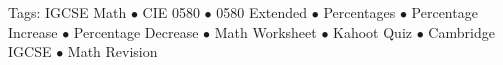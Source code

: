 \documentclass[11pt,a4paper]{article}
\begin{document}
\vspace{14pt}
\begin{center}
  \sffamily\scriptsize\textcolor{textmuted}{
    Tags: IGCSE Math $\bullet$ CIE 0580 $\bullet$ 0580 Extended $\bullet$ Percentages $\bullet$ Percentage Increase $\bullet$ Percentage Decrease $\bullet$ Math Worksheet $\bullet$ Kahoot Quiz $\bullet$ Cambridge IGCSE $\bullet$ Math Revision
  }
\end{center}
\end{document}
